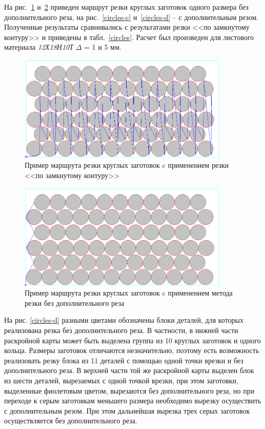 \documentclass[11pt,twoside,openany]{report}
\begin{document}
На рис.~\ref{circles-a}
и~\ref{circles-b}
приведен маршрут резки
круглых заготовок одного размера без дополнительного реза,
на рис.~\ref{circles-c}
и~\ref{circles-d} -- с дополнительным резом.
Полученные результаты сравнивались с результатами
резки <<по замкнутому контуру>> и приведены в
табл.~\ref{circles}.
Расчет был произведен для листового материала
{\it 12Х18Н10Т}
$\Delta$ = 1 и 5 мм.

\begin{figure}
  \begin{center}
  \includegraphics[width=0.9\textwidth]{circles-a.png}
  \caption{Пример маршрута резки круглых заготовок c применением резки <<по замкнутому контуру>>}
  \label{circles-a}
  \end{center}
\end{figure}

\begin{figure}
  \begin{center}
  \includegraphics[width=0.9\textwidth]{circles-b.png}
  \caption{Пример маршрута резки круглых заготовок c применением метода резки без дополнительного реза}
  \label{circles-b}
  \end{center}
\end{figure}

На рис. \ref{circles-d}
разными цветами обозначены блоки деталей,
для которых реализована резка без дополнительного реза.
В частности, в нижней  части раскройной карты
может быть выделена
группа из 10 круглых заготовок и одного кольца.
Размеры заготовок отличаются незначительно,
поэтому есть возможность реализовать резку блока из 11 деталей с
помощью одной точки врезки и без дополнительного реза.
В  верхней части той же раскройной карты выделен блок из шести деталей,
вырезаемых с одной точкой врезки, при этом заготовки,
выделенные фиолетовым цветом, вырезаются без дополнительного реза,
но при переходе к серым заготовкам меньшего размера необходимо
вырезку осуществить с дополнительным резом.
При этом дальнейшая вырезка трех серых заготовок
осуществляется без дополнительного реза.
\end{document}
